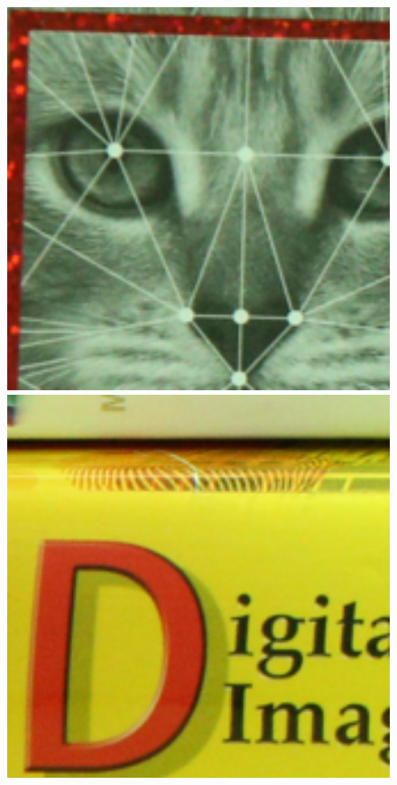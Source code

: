 \documentclass[10pt,twocolumn,letterpaper]{article}
\begin{document}
\begin{figure}[t]
{\begin{minipage}{0.055\textwidth}
\end{minipage}
\begin{minipage}{0.055\textwidth}
\includegraphics[width=1\textwidth]{images/resize_CC_Noisy_Canon_EOS_5D_Mark3_ISO_3200_C3_26.png}
\end{minipage}
\begin{minipage}{0.055\textwidth}
\includegraphics[width=1\textwidth]{images/resize_CC_Noisy_Canon_EOS_5D_Mark3_ISO_3200_C3_73.png}

\end{minipage}}
\end{figure}
\end{document}
